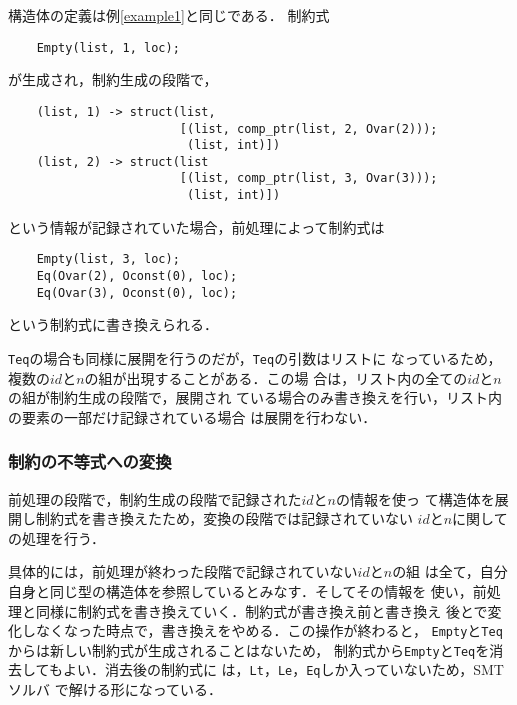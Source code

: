 \begin{example}
  構造体の定義は例\ref{example1}と同じである．
  制約式
\begin{verbatim}
    Empty(list, 1, loc);
\end{verbatim}
  が生成され，制約生成の段階で，
\begin{verbatim}
    (list, 1) -> struct(list,
                        [(list, comp_ptr(list, 2, Ovar(2)));
                         (list, int)])
    (list, 2) -> struct(list
                        [(list, comp_ptr(list, 3, Ovar(3)));
                         (list, int)])
\end{verbatim}
  という情報が記録されていた場合，前処理によって制約式は
\begin{verbatim}
    Empty(list, 3, loc);
    Eq(Ovar(2), Oconst(0), loc);
    Eq(Ovar(3), Oconst(0), loc);
\end{verbatim}
  という制約式に書き換えられる．
\end{example}

\texttt{Teq}の場合も同様に展開を行うのだが，\texttt{Teq}の引数はリストに
なっているため，複数の$\mathit{id}$と$n$の組が出現することがある．この場
合は，リスト内の全ての$\mathit{id}$と$n$の組が制約生成の段階で，展開され
ている場合のみ書き換えを行い，リスト内の要素の一部だけ記録されている場合
は展開を行わない．


\subsubsection{制約の不等式への変換}
前処理の段階で，制約生成の段階で記録された$\mathit{id}$と$n$の情報を使っ
て構造体を展開し制約式を書き換えたため，変換の段階では記録されていない
$\mathit{id}$と$n$に関しての処理を行う．

具体的には，前処理が終わった段階で記録されていない$\mathit{id}$と$n$の組
は全て，自分自身と同じ型の構造体を参照しているとみなす．そしてその情報を
使い，前処理と同様に制約式を書き換えていく．制約式が書き換え前と書き換え
後とで変化しなくなった時点で，書き換えをやめる．この操作が終わると，
\texttt{Empty}と\texttt{Teq}からは新しい制約式が生成されることはないため，
制約式から\texttt{Empty}と\texttt{Teq}を消去してもよい．消去後の制約式に
は，\texttt{Lt}，\texttt{Le}，\texttt{Eq}しか入っていないため，SMTソルバ
で解ける形になっている．

